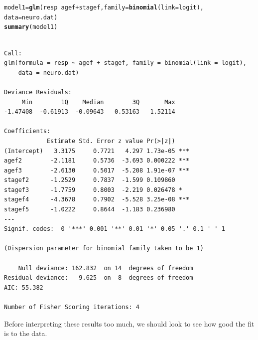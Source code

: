 \documentclass[oneside]{book}\usepackage[]{graphicx}\usepackage[svgnames]{xcolor}
\makeatletter
\newcommand{\hlopt}[1]{\textcolor[rgb]{0,0,0}{#1}}%
\newcommand{\hlstd}[1]{\textcolor[rgb]{0.345,0.345,0.345}{#1}}%
\newcommand{\hlkwb}[1]{\textcolor[rgb]{0.69,0.353,0.396}{#1}}%
\newcommand{\hlkwc}[1]{\textcolor[rgb]{0.333,0.667,0.333}{#1}}%
\newcommand{\hlkwd}[1]{\textcolor[rgb]{0.737,0.353,0.396}{\textbf{#1}}}%
\newenvironment{kframe}{%
 \def\at@end@of@kframe{}%
 \ifinner\ifhmode%
  \def\at@end@of@kframe{\end{minipage}}%
  \begin{minipage}{\columnwidth}%
 \fi\fi%
 \def\FrameCommand##1{\hskip\@totalleftmargin \hskip-\fboxsep
 \colorbox{shadecolor}{##1}\hskip-\fboxsep
     \hskip-\linewidth \hskip-\@totalleftmargin \hskip\columnwidth}%
 \MakeFramed {\advance\hsize-\width
   \@totalleftmargin\z@ \linewidth\hsize
   \@setminipage}}%
 {\par\unskip\endMakeFramed%
 \at@end@of@kframe}
\newenvironment{knitrout}{}{} %
\makeatother
\begin{document}
\begin{knitrout}
\color{fgcolor}\begin{kframe}
\begin{alltt}
\hlstd{model1} \hlkwb{=} \hlkwd{glm}\hlstd{(resp} \hlopt{~} \hlstd{agef} \hlopt{+} \hlstd{stagef,} \hlkwc{family} \hlstd{=} \hlkwd{binomial}\hlstd{(}\hlkwc{link} \hlstd{= logit),}
  \hlkwc{data} \hlstd{= neuro.dat)}
\hlkwd{summary}\hlstd{(model1)}
\end{alltt}
\begin{verbatim}

Call:
glm(formula = resp ~ agef + stagef, family = binomial(link = logit), 
    data = neuro.dat)

Deviance Residuals: 
     Min        1Q    Median        3Q       Max  
-1.47408  -0.61913  -0.09643   0.53163   1.52114  

Coefficients:
            Estimate Std. Error z value Pr(>|z|)    
(Intercept)   3.3175     0.7721   4.297 1.73e-05 ***
agef2        -2.1181     0.5736  -3.693 0.000222 ***
agef3        -2.6130     0.5017  -5.208 1.91e-07 ***
stagef2      -1.2529     0.7837  -1.599 0.109860    
stagef3      -1.7759     0.8003  -2.219 0.026478 *  
stagef4      -4.3678     0.7902  -5.528 3.25e-08 ***
stagef5      -1.0222     0.8644  -1.183 0.236980    
---
Signif. codes:  0 '***' 0.001 '**' 0.01 '*' 0.05 '.' 0.1 ' ' 1

(Dispersion parameter for binomial family taken to be 1)

    Null deviance: 162.832  on 14  degrees of freedom
Residual deviance:   9.625  on  8  degrees of freedom
AIC: 55.382

Number of Fisher Scoring iterations: 4
\end{verbatim}
\end{kframe}
\end{knitrout}
Before interpreting these results too much, we should look to see how good the fit is to
the data.
\end{document}
